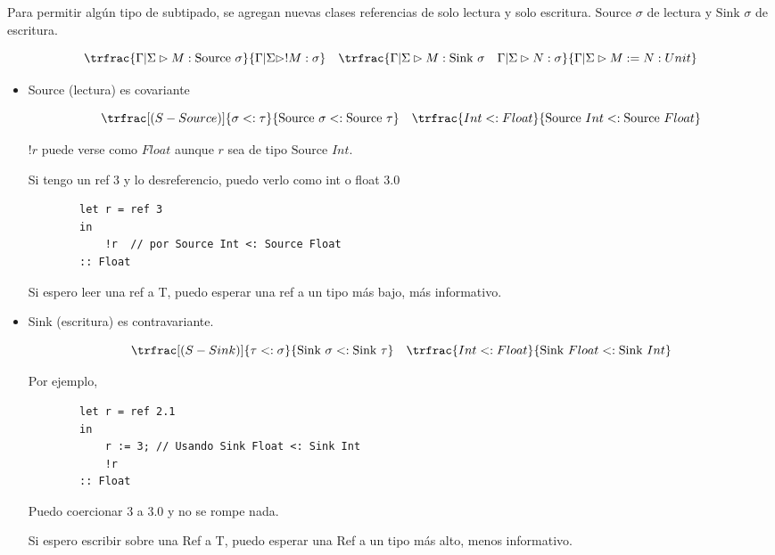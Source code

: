 \documentclass{report}
\theoremstyle{definition} %
\newcommand{\tipa}[3]{#1 \rhd #2 : #3} %
\newcommand{\GStipa}[2]{\tipa{\Gamma|\Sigma}{#1}{#2}}
\newcommand{\dealloc}[1]{!#1}
\newcommand{\assign}[2]{#1 := #2}
\newcommand{\tunit}{Unit}
\newcommand{\deriv}[3]{\trfrac[(#1)]{#2}{#3}}
\newcommand{\ederiv}[2]{\trfrac{#1}{#2}} %
\newcommand{\subt}[2]{#1 <: #2}
\newcommand{\tsource}[1]{\text{Source } #1}
\newcommand{\tsink}[1]{\text{Sink } #1}
\begin{document}
Para permitir algún tipo de subtipado, se agregan nuevas clases referencias de
solo lectura y solo escritura. $\tsource{\sigma}$ de lectura y $\tsink{\sigma}$
de escritura.

\[
    \ederiv
        {\GStipa{M}{\tsource{\sigma}}}
        {\GStipa{\dealloc{M}}{\sigma}}
    \quad
    \ederiv
        {\GStipa{M}{\tsink{\sigma}} \quad \GStipa{N}{\sigma}}
        {\GStipa{\assign{M}{N}}{\tunit}}
\]

\begin{itemize}
    \item Source (lectura) es covariante
    
    \[
        \deriv{S-Source}
            {\subt{\sigma}{\tau}}
            {\subt{\tsource{\sigma}}{\tsource{\tau}}}
        \quad
        \ederiv
            {\subt{Int}{Float}}
            {\subt{\tsource{Int}}{\tsource{Float}}}
    \]

    $\dealloc{r}$ puede verse como $Float$ aunque $r$ sea de tipo
    $\tsource{Int}$.

    Si tengo un ref 3 y lo desreferencio, puedo verlo como int o float 3.0
    
    \begin{verbatim}
        let r = ref 3
        in
            !r  // por Source Int <: Source Float
        :: Float
    \end{verbatim}

    Si espero leer una ref a T, puedo esperar una ref a un tipo más bajo, más
    informativo.

    \item Sink (escritura) es contravariante.

    \[
        \deriv{S-Sink}
            {\subt{\tau}{\sigma}}
            {\subt{\tsink{\sigma}}{\tsink{\tau}}}
        \quad
        \ederiv
            {\subt{Int}{Float}}
            {\subt{\tsink{Float}}{\tsink{Int}}}
    \]

    Por ejemplo,

    \begin{verbatim}
        let r = ref 2.1
        in
            r := 3; // Usando Sink Float <: Sink Int
            !r
        :: Float
    \end{verbatim}

    Puedo coercionar 3 a 3.0 y no se rompe nada.

    Si espero escribir sobre una Ref a T, puedo esperar una Ref a un tipo más
    alto, menos informativo.
\end{itemize}
\end{document}
